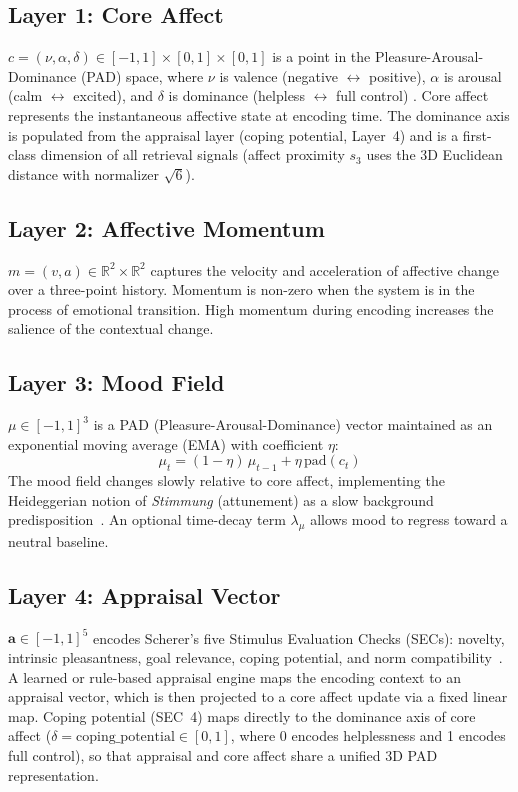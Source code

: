 \documentclass[11pt]{article}
\begin{document}
\subsection{Layer 1: Core Affect}

$c = (\nu, \alpha, \delta) \in [-1,1] \times [0,1] \times [0,1]$ is a point in
the Pleasure-Arousal-Dominance (PAD) space, where $\nu$ is valence (negative
$\leftrightarrow$ positive), $\alpha$ is arousal (calm $\leftrightarrow$ excited),
and $\delta$ is dominance (helpless $\leftrightarrow$ full control)
\citep{russell1980circumplex,mehrabian1974approach}. Core affect represents the
instantaneous affective state at encoding time. The dominance axis is populated
from the appraisal layer (coping potential, Layer~4) and is a first-class
dimension of all retrieval signals (affect proximity $s_3$ uses the 3D
Euclidean distance with normalizer $\sqrt{6}$).

\subsection{Layer 2: Affective Momentum}

$m = (v, a) \in \mathbb{R}^2 \times \mathbb{R}^2$ captures the velocity and
acceleration of affective change over a three-point history. Momentum is
non-zero when the system is in the process of emotional transition. High momentum
during encoding increases the salience of the contextual change.

\subsection{Layer 3: Mood Field}

$\mu \in [-1,1]^3$ is a PAD (Pleasure-Arousal-Dominance) vector maintained as an
exponential moving average (EMA) with coefficient $\eta$:
\[
  \mu_t = (1 - \eta)\,\mu_{t-1} + \eta\,\text{pad}(c_t)
\]
The mood field changes slowly relative to core affect, implementing the
Heideggerian notion of \emph{Stimmung} (attunement) as a slow background
predisposition~\citep[§29]{heidegger1927sein}. An optional time-decay term
$\lambda_\mu$ allows mood to regress toward a neutral baseline.

\subsection{Layer 4: Appraisal Vector}

$\mathbf{a} \in [-1,1]^5$ encodes Scherer's five Stimulus Evaluation Checks (SECs):
novelty, intrinsic pleasantness, goal relevance, coping potential, and norm
compatibility~\citep{scherer1984appraisal}. A learned or rule-based appraisal
engine maps the encoding context to an appraisal vector, which is then projected
to a core affect update via a fixed linear map. Coping potential (SEC~4) maps
directly to the dominance axis of core affect ($\delta = \text{coping\_potential}
\in [0,1]$, where 0 encodes helplessness and 1 encodes full control), so that
appraisal and core affect share a unified 3D PAD representation.
\end{document}
